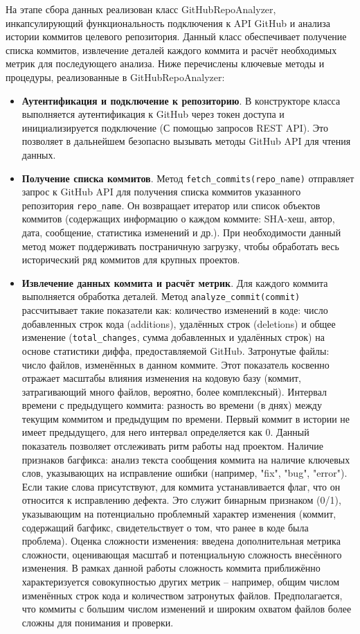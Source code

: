 На этапе сбора данных реализован класс GitHubRepoAnalyzer, инкапсулирующий функциональность подключения к API GitHub и анализа истории коммитов целевого репозитория. Данный класс обеспечивает получение списка коммитов, извлечение деталей каждого коммита и расчёт необходимых метрик для последующего анализа. Ниже перечислены ключевые методы и процедуры, реализованные в GitHubRepoAnalyzer:
\begin{itemize}
	\item \textbf{Аутентификация и подключение к репозиторию}. В конструкторе класса выполняется аутентификация к GitHub через токен доступа и инициализируется подключение (С помощью запросов REST API). Это позволяет в дальнейшем безопасно вызывать методы GitHub API для чтения данных.
	\item \textbf{Получение списка коммитов}. Метод \verb|fetch_commits(repo_name)| отправляет запрос к GitHub API для получения списка коммитов указанного репозитория \verb|repo_name|. Он возвращает итератор или список объектов коммитов (содержащих информацию о каждом коммите: SHA-хеш, автор, дата, сообщение, статистика изменений и др.). При необходимости данный метод может поддерживать постраничную загрузку, чтобы обработать весь исторический ряд коммитов для крупных проектов.
	\item \textbf{Извлечение данных коммита и расчёт метрик}. Для каждого коммита выполняется обработка деталей. Метод \verb|analyze_commit(commit)| рассчитывает такие показатели как: количество изменений в коде: число добавленных строк кода (additions), удалённых строк (deletions) и общее изменение (\verb|total_changes|, сумма добавленных и удалённых строк) на основе статистики диффа, предоставляемой GitHub. Затронутые файлы: число файлов, изменённых в данном коммите. Этот показатель косвенно отражает масштабы влияния изменения на кодовую базу (коммит, затрагивающий много файлов, вероятно, более комплексный). Интервал времени с предыдущего коммита: разность во времени (в днях) между текущим коммитом и предыдущим по времени. Первый коммит в истории не имеет предыдущего, для него интервал определяется как 0. Данный показатель позволяет отслеживать ритм работы над проектом. Наличие признаков багфикса: анализ текста сообщения коммита на наличие ключевых слов, указывающих на исправление ошибки (например, "fix", "bug", "error"). Если такие слова присутствуют, для коммита устанавливается флаг, что он относится к исправлению дефекта. Это служит бинарным признаком (0/1), указывающим на потенциально проблемный характер изменения (коммит, содержащий багфикс, свидетельствует о том, что ранее в коде была проблема). Оценка сложности изменения: введена дополнительная метрика сложности, оценивающая масштаб и потенциальную сложность внесённого изменения. В рамках данной работы сложность коммита приближённо характеризуется совокупностью других метрик – например, общим числом изменённых строк кода и количеством затронутых файлов. Предполагается, что коммиты с большим числом изменений и широким охватом файлов более сложны для понимания и проверки.

\end{itemize}
